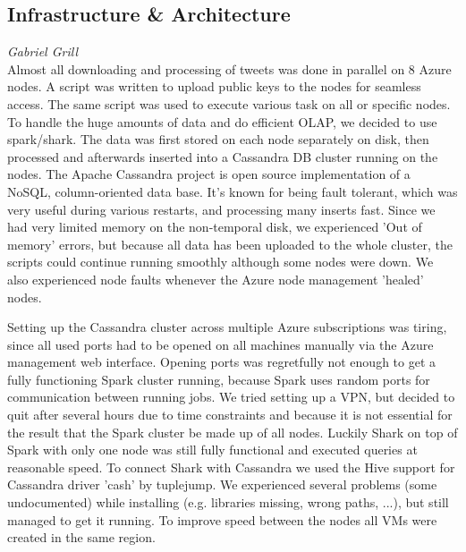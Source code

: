\subsection*{Infrastructure \& Architecture}
\emph{Gabriel Grill} \\
Almost all downloading and processing of tweets was done in parallel on 8 Azure nodes. A script was written to upload public keys to the nodes for seamless access. The same script was used to execute various task on all or specific nodes. To handle the huge amounts of data and do efficient OLAP, we decided to use spark/shark. The data was first stored on each node separately on disk, then processed and afterwards inserted into a Cassandra DB cluster running on the nodes. The Apache Cassandra project is open source implementation of a NoSQL, column-oriented data base. It's known for being fault tolerant, which was very useful during various restarts, and processing many inserts fast. Since we had very limited memory on the non-temporal disk, we experienced 'Out of memory' errors, but because all data has been uploaded to the whole cluster, the scripts could continue running smoothly although some nodes were down. We also experienced node faults whenever the Azure node management 'healed' nodes.

Setting up the Cassandra cluster across multiple Azure subscriptions was tiring, since all used ports had to be opened on all machines manually via the Azure management web interface. Opening ports was regretfully not enough to get a fully functioning Spark cluster running, because Spark uses random ports for communication between running jobs. We tried setting up a VPN, but decided to quit after several hours due to time constraints and because it is not essential for the result that the Spark cluster be made up of all nodes. Luckily Shark on top of Spark with only one node was still fully functional and executed queries at reasonable speed. To connect Shark with Cassandra we used the Hive support for Cassandra driver 'cash' by tuplejump. We experienced several problems (some undocumented) while installing (e.g. libraries missing, wrong paths, ...), but still managed to get it running. To improve speed between the nodes all VMs were created in the same region. 
